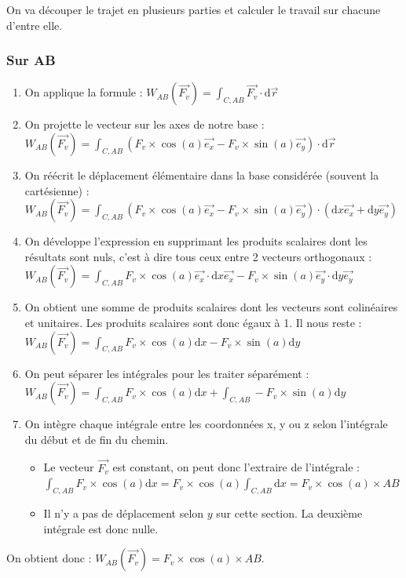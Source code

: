 \documentclass[french]{yLectureNote}
\renewcommand{\vec}{\overrightarrow}
\newcommand{\dd}[0]{\mathrm{d}}
\begin{document}
On va découper le trajet en plusieurs parties et calculer le travail sur chacune d'entre elle.
\subsubsection{Sur AB}
\begin{enumerate}
\item On applique la formule : $W_{AB}(\vec{F_v}) = \int_{C,AB}\vec{F_v}\cdot \dd \vec{r}$
 \item On projette le vecteur sur les axes de notre base : $W_{AB}(\vec{F_v}) = \int_{C,AB}(F_v\times\cos(a)\vec{e_x}-F_v\times\sin(a)\vec{e_y})\cdot \dd \vec{r}$
 \item On réécrit le déplacement élémentaire dans la base considérée (souvent la cartésienne) : $W_{AB}(\vec{F_v}) = \int_{C,AB}(F_v\times\cos(a)\vec{e_x}-F_v\times\sin(a)\vec{e_y})\cdot (\dd x \vec{e_x} + \dd y \vec{e_y})$
 \item On développe l'expression en supprimant les produits scalaires dont les résultats sont nuls, c'est à dire tous ceux entre 2 vecteurs orthogonaux :
 $W_{AB}(\vec{F_v}) = \int_{C,AB}F_v\times\cos(a)\vec{e_x}\cdot \dd x \vec{e_x}-F_v\times\sin(a)\vec{e_y}\cdot \dd y \vec{e_y}$
 \item On obtient une somme de produits scalaires dont les vecteurs sont colinéaires et unitaires. Les produits scalaires sont donc égaux à 1. Il nous reste :
  $W_{AB}(\vec{F_v}) = \int_{C,AB}F_v\times\cos(a) \dd x -F_v\times\sin(a) \dd y$
  \item On peut séparer les intégrales pour les traiter séparément :
  $W_{AB}(\vec{F_v}) = \int_{C,AB}F_v\times\cos(a) \dd x +\int_{C,AB}-F_v\times\sin(a) \dd y$
  \item On intègre chaque intégrale entre les coordonnées x, y ou z selon l'intégrale du début et de fin du chemin.
  \begin{itemize}
   \item Le vecteur $\vec{F_v}$ est constant, on peut donc l'extraire de l'intégrale : $\int_{C,AB}F_v\times\cos(a) \dd x = F_v\times\cos(a)\int_{C,AB} \dd x = F_v\times\cos(a)\times AB$
   \item Il n'y a pas de déplacement selon $y$ sur cette section. La deuxième intégrale est donc nulle.
  \end{itemize}
\end{enumerate}
On obtient donc : $W_{AB}(\vec{F_v}) = F_v\times\cos(a)\times AB$.
\end{document}
